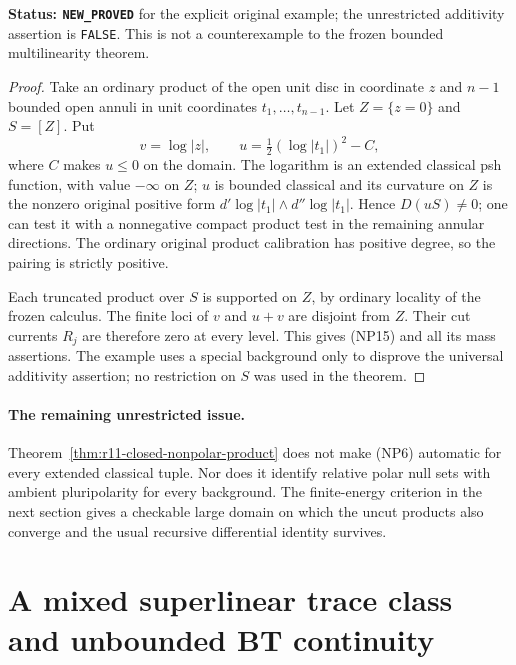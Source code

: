 \documentclass[11pt,a4paper]{article}
\numberwithin{equation}{section}
\theoremstyle{definition}
\theoremstyle{remark}
\begin{document}
\noindent\textbf{Status: \texttt{NEW\_PROVED}} for the explicit
original example; the unrestricted additivity assertion is
\texttt{FALSE}.  This is not a counterexample to the frozen bounded
multilinearity theorem.

\begin{proof}
Take an ordinary product of the open unit disc in coordinate $z$
and $n-1$ bounded open annuli in unit coordinates $t_1,\ldots,t_{n-1}$.
Let $Z=\{z=0\}$ and $S=[Z]$.  Put
\[
 v=\log|z|,\qquad
 u=\tfrac12(\log|t_1|)^2-C,
\]
where $C$ makes $u\leq0$ on the domain.  The logarithm is an extended
classical psh function, with value $-\infty$ on $Z$; $u$ is bounded
classical and its curvature on $Z$ is the nonzero original positive
form $d'\log|t_1|\wedge d''\log|t_1|$.  Hence $D(uS)\ne0$;
one can test it with a nonnegative compact product test in the
remaining annular directions.  The ordinary original product
calibration has positive degree, so the pairing is strictly positive.

Each truncated product over $S$ is supported on $Z$, by ordinary
locality of the frozen calculus.  The finite loci of $v$ and $u+v$
are disjoint from $Z$.  Their cut currents $R_j$ are therefore zero
at every level.  This gives (NP15) and all its mass assertions.
The example uses a special background only to disprove the universal
additivity assertion; no restriction on $S$ was used in the theorem.
\end{proof}

\paragraph{The remaining unrestricted issue.}
Theorem~\ref{thm:r11-closed-nonpolar-product} does not make (NP6)
automatic for every extended classical tuple.  Nor does it identify
relative polar null sets with ambient pluripolarity for every background.
The finite-energy criterion in the next section gives a checkable large
domain on which the uncut products also converge and the usual
recursive differential identity survives.



\section{A mixed superlinear trace class and unbounded BT continuity}
\label{sec:r11-superlinear-energy}
\end{document}
